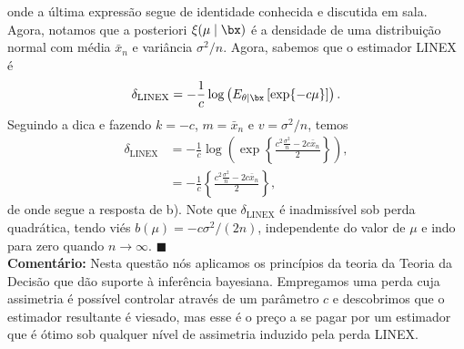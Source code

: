 {onde a última expressão segue de identidade conhecida e discutida em sala.
Agora, notamos que a posteriori $\xi(\mu \mid \bx)$ é a densidade de uma distribuição normal com média $\bar{x}_n$ e variância $\sigma^2/n$.
Agora, sabemos que o estimador LINEX é
\begin{align*}
    \delta_{\textrm{LINEX}} = -\frac{1}{c} \log\left( E_{\theta \mid \bx}\left[\exp\{-c\mu\}\right]\right).
\end{align*}
Seguindo a dica e fazendo $k = -c$, $m = \bar{x}_n$ e $v = \sigma^2/n$, temos
\begin{align*}
        \delta_{\textrm{LINEX}} &= -\frac{1}{c} \log\left(\exp\left\{\frac{c^2\frac{\sigma^2}{n} - 2c\bar{x}_n}{2}\right\}\right),\\
        &=  -\frac{1}{c} \left\{\frac{c^2\frac{\sigma^2}{n} - 2c\bar{x}_n}{2}\right\},
\end{align*}
de onde segue a resposta de b).
Note que $\delta_{\textrm{LINEX}}$ é inadmissível sob perda quadrática, tendo viés $b(\mu) = -c\sigma^2/(2n)$, independente do valor de $\mu$ e indo para zero quando $n\to \infty$.
$\blacksquare$\\
\textbf{Comentário:} Nesta questão nós aplicamos os princípios da teoria da Teoria da Decisão que dão suporte à inferência bayesiana.
Empregamos uma perda cuja assimetria é possível controlar através de um parâmetro $c$ e descobrimos que o estimador resultante é viesado, mas esse é o preço a se pagar por um estimador que é ótimo sob qualquer nível de assimetria induzido pela perda LINEX.
}